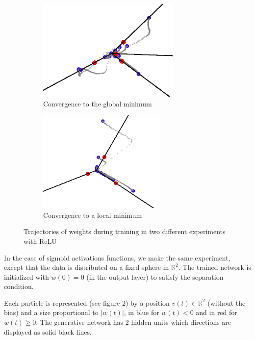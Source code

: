 \documentclass[a4paper, 11pt]{scrartcl}
\begin{document}
{\begin{figure}[h]
\centering
\begin{subfigure}{.5\textwidth}
  \centering
  \includegraphics[height=5cm]{relu.png}
  \caption{Convergence to the global minimum}
  \label{fig:sub3}
\end{subfigure}%
\begin{subfigure}{.5\textwidth}
  \centering
  \includegraphics[height=5cm]{relu_fail.png}
  \caption{Convergence to a local minimum}
  \label{fig:sub4}
\end{subfigure}%
  \caption{Trajectories of weights during training in two different experiments with ReLU}
\end{figure}


In the case of sigmoid activations functions, we make the same experiment, except that the data is distributed on a fixed sphere in $\mathbb{R}^2$. The trained network is initialized with $w(0)=0$ (in the output layer) to satisfy the separation condition.

Each particle is represented (see figure 2) by a position $v(t) \in \mathbb{R}^2$ (without the bias) and a size proportional to $|w(t)|$, in blue for $w(t)<0$ and in red for $w(t) \geq 0$. The generative network has 2 hidden units which directions are displayed as solid black lines. 


}
\end{document}
